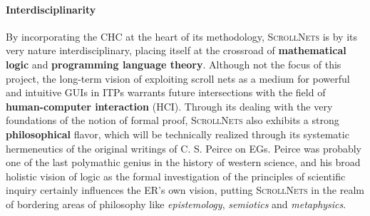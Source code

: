 \documentclass[12pt,draftproposal]{msca-pf}
\newcommand{\proj}{\small\textsc{ScrollNets}}
\newcommand{\WP}[1]{$\mathsf{WP#1}$}
\begin{document}

\paragraph{Interdisciplinarity} By incorporating the CHC at the heart of its methodology, {\proj} is
by its very nature interdisciplinary, placing itself at the crossroad of \textbf{mathematical logic}
and \textbf{programming language theory}. Although not the focus of this project, the long-term
vision of exploiting scroll nets as a medium for powerful and intuitive GUIs in ITPs warrants future
intersections with the field of \textbf{human-computer interaction} (HCI). Through its dealing with
the very foundations of the notion of formal proof, {\proj} also exhibits a strong
\textbf{philosophical} flavor, which will be technically realized through its systematic
hermeneutics of the original writings of C. S. Peirce on EGs. Peirce was probably one of the last
polymathic genius in the history of western science, and his broad holistic vision of logic as the
formal investigation of the principles of scientific inquiry certainly influences the ER's own
vision, putting {\proj} in the realm of bordering areas of philosophy like \emph{epistemology},
\emph{semiotics} and \emph{metaphysics}.
\end{document}
